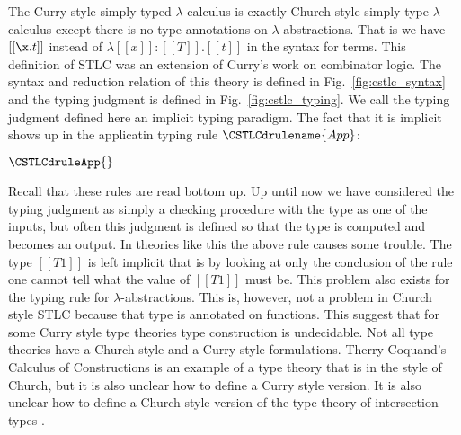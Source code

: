 The Curry-style simply typed $\lambda$-calculus is exactly
Church-style simply type $\lambda$-calculus except there is no type
annotations on $\lambda$-abstractions.  That is we have $[[\x.t]]$
instead of $\lambda [[x]]:[[T]].[[t]]$ in the syntax for terms.  This
definition of STLC was an extension of Curry's work on combinator
logic. The syntax and reduction relation of this theory is defined in
Fig.~\ref{fig:cstlc_syntax} and the typing judgment is defined in
Fig.~\ref{fig:cstlc_typing}. We call the typing judgment defined
here an implicit typing paradigm.  The fact that it is implicit shows
up in the applicatin typing rule $\CSTLCdrulename{App}$:
\begin{center}
  \begin{math}
    \CSTLCdruleApp{}
  \end{math}
\end{center}
Recall that these rules are read bottom up.  Up until now we have
considered the typing judgment as simply a checking procedure with the
type as one of the inputs, but often this judgment is defined so that
the type is computed and becomes an output.  In theories like this the
above rule causes some trouble.  The type $[[T1]]$ is left implicit
that is by looking at only the conclusion of the rule one cannot tell
what the value of $[[T1]]$ must be.  This problem also exists for the
typing rule for $\lambda$-abstractions.  This is, however, not a
problem in Church style STLC because that type is annotated on
functions.  This suggest that for some Curry style type theories type
construction is undecidable.  Not all type theories have a Church
style and a Curry style formulations.  Therry Coquand's Calculus of
Constructions is an example of a type theory that is in the style of
Church, but it is also unclear how to define a Curry style version.
It is also unclear how to define a Church style version of the type
theory of intersection types \cite{Barendregt:1992}.

